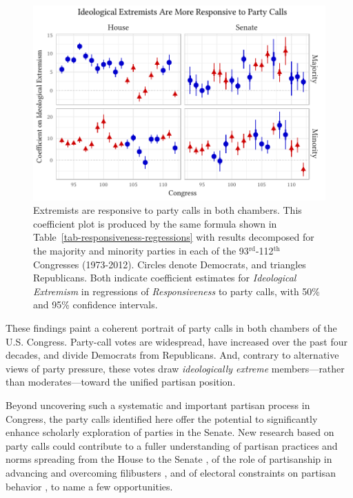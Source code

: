\documentclass[12pt]{article}
\begin{document}
\begin{figure}[t]
\centering
\includegraphics{extremism-responsiveness}
\caption{
  Extremists are responsive to party calls in both chambers.
  This coefficient plot is produced by the same formula shown in
  Table~\ref{tab-responsiveness-regressions} with results decomposed for the
  majority and minority parties in each of the
  93$^{\text{rd}}$-112$^{\text{th}}$ Congresses (1973-2012).
  Circles denote Democrats, and triangles Republicans.
  Both indicate coefficient estimates for \textit{Ideological Extremism} in
  regressions of \textit{Responsiveness} to party calls, with 50\% and 95\%
  confidence intervals.
  \label{fig-extremism-responsiveness}}
\end{figure}

These findings paint a coherent portrait of party calls in both chambers of the
U.S. Congress.
Party-call votes are widespread, have increased over the past four decades, and
divide Democrats from Republicans.
And, contrary to alternative views of party pressure, these votes draw
\textit{ideologically extreme} members---rather than moderates---toward the
unified partisan position.

Beyond uncovering such a systematic and important partisan process in Congress,
the party calls identified here offer the potential to significantly enhance
scholarly exploration of parties in the Senate.
New research based on party calls could contribute to a fuller understanding of
partisan practices and norms spreading from the House to the Senate
\citep[e.g.,][]{Theriault:2013}, of the role of partisanship in advancing and
overcoming filibusters \citep[e.g.,][]{Wawro:2013}, and of electoral
constraints on partisan behavior \citep[e.g.,][]{Levitt:1996}, to name a few
opportunities.
\end{document}
